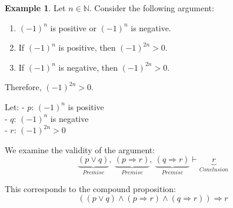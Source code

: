 \documentclass[
]{book}
\providecommand{\tightlist}{%
  \setlength{\itemsep}{0pt}\setlength{\parskip}{0pt}}
\theoremstyle{definition}
\theoremstyle{definition}
\newtheorem{example}{Example}[chapter]
\theoremstyle{definition}
\theoremstyle{definition}
\theoremstyle{remark}
\begin{document}
\begin{example}
\protect\hypertarget{exm:unnamed-chunk-57}{}\label{exm:unnamed-chunk-57}Let \(n \in \mathbb{N}\). Consider the following argument:

\begin{enumerate}
\def\labelenumi{\arabic{enumi}.}
\tightlist
\item
  \((-1)^n\) is positive or \((-1)^n\) is negative.\\
\item
  If \((-1)^n\) is positive, then \((-1)^{2n} > 0\).\\
\item
  If \((-1)^n\) is negative, then \((-1)^{2n} > 0\).
\end{enumerate}

Therefore, \((-1)^{2n} > 0\).

Let:
- \(p\): \((-1)^n\) is positive\\
- \(q\): \((-1)^n\) is negative\\
- \(r\): \((-1)^{2n} > 0\)

We examine the validity of the argument:
\[
\underbrace{(p \lor q)}_{Premise},\ \underbrace{(p \Rightarrow r)}_{Premise},\ \underbrace{(q \Rightarrow r)}_{Premise} \vdash \underbrace{r}_{Conclusion}
\]

This corresponds to the compound proposition:
\[
((p \lor q) \land (p \Rightarrow r) \land (q \Rightarrow r)) \Rightarrow r
\]


\end{example}
\end{document}
